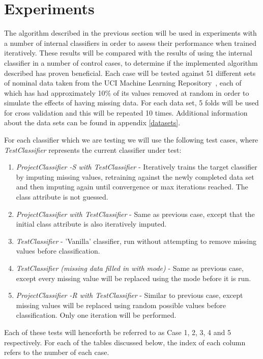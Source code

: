 \newpage
\chapter{Experiments}\label{experiments}
The algorithm described in the previous section will be used in experiments with a number of internal classifiers in order to assess their performance when trained iteratively. These results will be compared with the results of using the internal classifier in a number of control cases, to determine if the implemented algorithm described has proven beneficial. Each case will be tested against 51 different sets of nominal data taken from the UCI Machine Learning Repository~\cite{Lichman:2013}, each of which has had approximately 10\% of its values removed at random in order to simulate the effects of having missing data. For each data set, 5 folds will be used for cross validation and this will be repeated 10 times. Additional information about the data sets can be found in appendix \ref{datasets}.

For each classifier which we are testing we will use the following test cases, where \textit{TestClassifier} represents the current classifier under test:

\begin{enumerate}
\item \textit{ProjectClassifier -S with TestClassifier} - Iteratively trains the target classifier by imputing missing values, retraining against the newly completed data set and then imputing again until convergence or max iterations reached. The class attribute is not guessed.
\item \textit{ProjectClassifier with TestClassifier} - Same as previous case, except that the initial class attribute is also iteratively imputed.
\item \textit{TestClassifier} - 'Vanilla' classifier, run without attempting to remove missing values before classification.
\item \textit{TestClassifier (missing data filled in with mode)} - Same as previous case, except every missing value will be replaced using the mode before it is run.
\item \textit{ProjectClassifier -R with TestClassifier} - Similar to previous case, except missing values will be replaced using random possible values before classification. Only one iteration will be performed.
\end{enumerate}

Each of these tests will henceforth be referred to as Case 1, 2, 3, 4 and 5 respectively. For each of the tables discussed below, the index of each column refers to the number of each case. 

